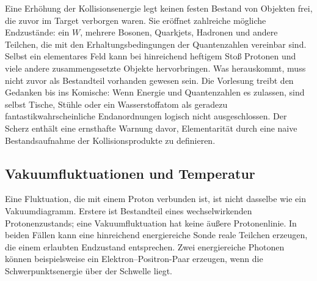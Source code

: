 Eine Erhöhung der Kollisionsenergie legt keinen festen Bestand von Objekten frei, die zuvor im Target verborgen waren. Sie eröffnet zahlreiche mögliche Endzustände: ein \(W\), mehrere Bosonen, Quarkjets, Hadronen und andere Teilchen, die mit den Erhaltungsbedingungen der Quantenzahlen vereinbar sind. Selbst ein elementares Feld kann bei hinreichend heftigem Stoß Protonen und viele andere zusammengesetzte Objekte hervorbringen. Was herauskommt, muss nicht zuvor als Bestandteil vorhanden gewesen sein. Die Vorlesung treibt den Gedanken bis ins Komische: Wenn Energie und Quantenzahlen es zulassen, sind selbst Tische, Stühle oder ein Wasserstoffatom als geradezu fantastikwahrscheinliche Endanordnungen logisch nicht ausgeschlossen. Der Scherz enthält eine ernsthafte Warnung davor, Elementarität durch eine naive Bestandsaufnahme der Kollisionsprodukte zu definieren.

\subsection{Vakuumfluktuationen und Temperatur}

Eine Fluktuation, die mit einem Proton verbunden ist, ist nicht dasselbe wie ein Vakuumdiagramm. Erstere ist Bestandteil eines wechselwirkenden Protonenzustands; eine Vakuumfluktuation hat keine äußere Protonenlinie. In beiden Fällen kann eine hinreichend energiereiche Sonde reale Teilchen erzeugen, die einem erlaubten Endzustand entsprechen. Zwei energiereiche Photonen können beispielsweise ein Elektron--Positron-Paar erzeugen, wenn die Schwerpunktsenergie über der Schwelle liegt.

\begin{classroomqa}
\end{classroomqa}

\begin{classroomqa}
\end{classroomqa}

